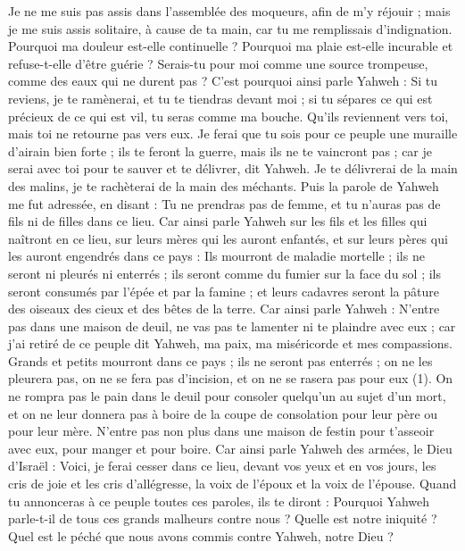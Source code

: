 \begin{multicols}{2}
Je ne me suis pas assis dans l’assemblée des moqueurs, afin de m’y réjouir ; mais je me suis assis solitaire, à cause de ta main, car tu me remplissais d’indignation.
Pourquoi ma douleur est-elle continuelle ? Pourquoi ma plaie est-elle incurable et refuse-t-elle d'être guérie ? Serais-tu pour moi comme une source trompeuse, comme des eaux qui ne durent pas ?
C'est pourquoi ainsi parle Yahweh : Si tu reviens, je te ramènerai, et tu te tiendras devant moi ; si tu sépares ce qui est précieux de ce qui est vil, tu seras comme ma bouche. Qu'ils reviennent vers toi, mais toi ne retourne pas vers eux.
Je ferai que tu sois pour ce peuple une muraille d'airain bien forte ; ils te feront la guerre, mais ils ne te vaincront pas ; car je serai avec toi pour te sauver et te délivrer, dit Yahweh.
Je te délivrerai de la main des malins, je te rachèterai de la main des méchants.
\VerseOne{}Puis la parole de Yahweh me fut adressée, en disant :
Tu ne prendras pas de femme, et tu n'auras pas de fils ni de filles dans ce lieu.
Car ainsi parle Yahweh sur les fils et les filles qui naîtront en ce lieu, sur leurs mères qui les auront enfantés, et sur leurs pères qui les auront engendrés dans ce pays :
Ils mourront de maladie mortelle ; ils ne seront ni pleurés ni enterrés ; ils seront comme du fumier sur la face du sol ; ils seront consumés par l'épée et par la famine ; et leurs cadavres seront la pâture des oiseaux des cieux et des bêtes de la terre.
Car ainsi parle Yahweh : N'entre pas dans une maison de deuil, ne vas pas te lamenter ni te plaindre avec eux ; car j'ai retiré de ce peuple dit Yahweh, ma paix, ma miséricorde et mes compassions.
Grands et petits mourront dans ce pays ; ils ne seront pas enterrés ; on ne les pleurera pas, on ne se fera pas d’incision, et on ne se rasera pas pour eux\FTNT{} (1).
On ne rompra pas le pain dans le deuil pour consoler quelqu'un au sujet d'un mort, et on ne leur donnera pas à boire de la coupe de consolation pour leur père ou pour leur mère.
N'entre pas non plus dans une maison de festin pour t'asseoir avec eux, pour manger et pour boire.
Car ainsi parle Yahweh des armées, le Dieu d'Israël : Voici, je ferai cesser dans ce lieu, devant vos yeux et en vos jours, les cris de joie et les cris d'allégresse, la voix de l'époux et la voix de l'épouse.
Quand tu annonceras à ce peuple toutes ces paroles, ils te diront : Pourquoi Yahweh parle-t-il de tous ces grands malheurs contre nous ? Quelle est notre iniquité ? Quel est le péché que nous avons commis contre Yahweh, notre Dieu ?

\end{multicols}
